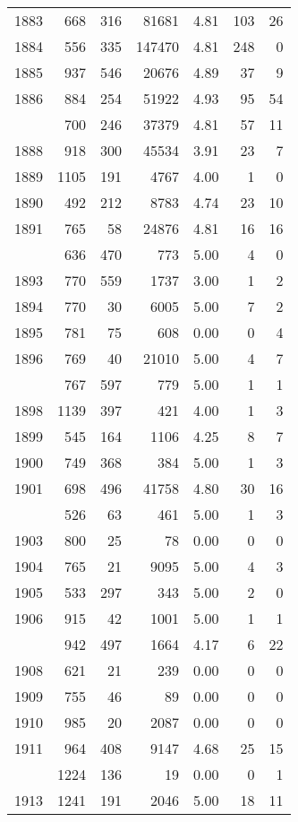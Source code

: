 \documentclass[
]{article}
\begin{document}
\begin{table}
\begin{tabular}[t]{lrrrrrr}
1883 & 668 & 316 & 81681 & 4.81 & 103 & 26\\
1884 & 556 & 335 & 147470 & 4.81 & 248 & 0\\
1885 & 937 & 546 & 20676 & 4.89 & 37 & 9\\
1886 & 884 & 254 & 51922 & 4.93 & 95 & 54\\
\addlinespace
1887 & 700 & 246 & 37379 & 4.81 & 57 & 11\\
1888 & 918 & 300 & 45534 & 3.91 & 23 & 7\\
1889 & 1105 & 191 & 4767 & 4.00 & 1 & 0\\
1890 & 492 & 212 & 8783 & 4.74 & 23 & 10\\
1891 & 765 & 58 & 24876 & 4.81 & 16 & 16\\
\addlinespace
1892 & 636 & 470 & 773 & 5.00 & 4 & 0\\
1893 & 770 & 559 & 1737 & 3.00 & 1 & 2\\
1894 & 770 & 30 & 6005 & 5.00 & 7 & 2\\
1895 & 781 & 75 & 608 & 0.00 & 0 & 4\\
1896 & 769 & 40 & 21010 & 5.00 & 4 & 7\\
\addlinespace
1897 & 767 & 597 & 779 & 5.00 & 1 & 1\\
1898 & 1139 & 397 & 421 & 4.00 & 1 & 3\\
1899 & 545 & 164 & 1106 & 4.25 & 8 & 7\\
1900 & 749 & 368 & 384 & 5.00 & 1 & 3\\
1901 & 698 & 496 & 41758 & 4.80 & 30 & 16\\
\addlinespace
1902 & 526 & 63 & 461 & 5.00 & 1 & 3\\
1903 & 800 & 25 & 78 & 0.00 & 0 & 0\\
1904 & 765 & 21 & 9095 & 5.00 & 4 & 3\\
1905 & 533 & 297 & 343 & 5.00 & 2 & 0\\
1906 & 915 & 42 & 1001 & 5.00 & 1 & 1\\
\addlinespace
1907 & 942 & 497 & 1664 & 4.17 & 6 & 22\\
1908 & 621 & 21 & 239 & 0.00 & 0 & 0\\
1909 & 755 & 46 & 89 & 0.00 & 0 & 0\\
1910 & 985 & 20 & 2087 & 0.00 & 0 & 0\\
1911 & 964 & 408 & 9147 & 4.68 & 25 & 15\\
\addlinespace
1912 & 1224 & 136 & 19 & 0.00 & 0 & 1\\
1913 & 1241 & 191 & 2046 & 5.00 & 18 & 11\\

\end{tabular}
\end{table}
\end{document}

